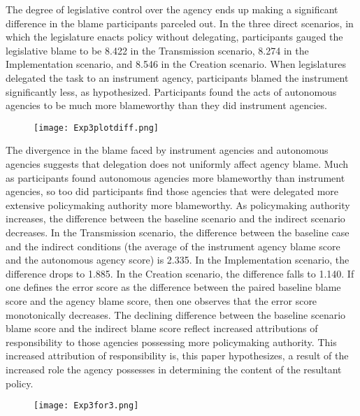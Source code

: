 \documentclass{article}
\begin{document}
The degree of legislative control over the agency ends up making a significant difference in the blame participants parceled out. In the three direct scenarios, in which the legislature enacts policy without delegating, participants gauged the legislative blame to be 8.422 in the Transmission scenario, 8.274 in the Implementation scenario, and 8.546 in the Creation scenario. When legislatures delegated the task to an instrument agency, participants blamed the instrument significantly less, as hypothesized. Participants found the acts of autonomous agencies to be much more blameworthy than they did instrument agencies. 


\begin{figure}[htb]
\begin{center}
\texttt{[image: Exp3plotdiff.png]}
\end{center}
\end{figure}

The divergence in the blame faced by instrument agencies and autonomous agencies suggests that delegation does not uniformly affect agency blame. Much as participants found autonomous agencies more blameworthy than instrument agencies, so too did participants find those agencies that were delegated more extensive policymaking authority more blameworthy. As policymaking authority increases, the difference between the baseline scenario and the indirect scenario decreases. In the Transmission scenario, the difference between the baseline case and the indirect conditions (the average of the instrument agency blame score and the autonomous agency score) is 2.335. In the Implementation scenario, the difference drops to 1.885. In the Creation scenario, the difference falls to 1.140. If one defines the error score as the difference between the paired baseline blame score and the agency blame score, then one observes that the error score monotonically decreases. The declining difference between the baseline scenario blame score and the indirect blame score reflect increased attributions of responsibility to those agencies possessing more policymaking authority. This increased attribution of responsibility is, this paper hypothesizes, a result of the increased role the agency possesses in determining the content of the resultant policy. 


\begin{figure}[htb]
\begin{center}
\texttt{[image: Exp3for3.png]}
\end{center}
\end{figure}
\end{document}
